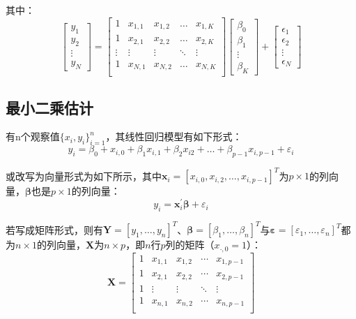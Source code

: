 \documentclass[11pt]{article}
\begin{document}
其中：
\begin{equation*}
    \begin{bmatrix}
        y_1 \\
        y_2 \\
        \vdots \\
        y_N
    \end{bmatrix} =
    \begin{bmatrix}
        1 & x_{1,1} & x_{1,2} & \dots & x_{1,K} \\
        1 & x_{2,1} & x_{2,2} & \dots & x_{2,K} \\
        \vdots & \vdots & \vdots & \ddots & \vdots \\
        1 & x_{N,1} & x_{N,2} & \dots & x_{N,K} \\
    \end{bmatrix}
    \begin{bmatrix}
        \beta_0 \\
        \beta_1 \\
        \vdots \\
        \beta_K
    \end{bmatrix} + 
    \begin{bmatrix}
        \epsilon_1 \\
        \epsilon_2 \\
        \vdots \\
        \epsilon_N
    \end{bmatrix}
\end{equation*}

\subsection{最小二乘估计}

有n个观察值$\{x_i,y_i\}_{i=1}^{n}$，其线性回归模型有如下形式：
\begin{equation*}
    y_i = \beta_0 + x_{i,0} + \beta_1 x_{i,1} + \beta_2 x_{i2} + \dots + \beta_{p-1} x_{i,p-1} + \varepsilon_{i}
\end{equation*}

或改写为向量形式为如下所示，其中$\bm{x}_i = [x_{i,0},x_{i,2},\dots,x_{i,p-1}]^{T}$为$p\times 1$的列向量，$\bm{\beta}$也是$p \times 1$的列向量：
\begin{equation*}
    y_i = \bm{x}_{i}^{'} \bm{\beta} + \varepsilon_i
\end{equation*}

若写成矩阵形式，则有$\bm{Y}=[y_1,\dots,y_n]^{T}$、$\bm{\beta}=[\beta_1,\dots,\beta_n]^{T}$与$\bm{\varepsilon}=[\varepsilon_1,\dots,\varepsilon_n]^{T}$都为$n\times 1$的列向量，$\bm{X}$为$n\times p$，即$n$行$p$列的矩阵（$x_{\cdot,0}=1$）：
\begin{equation*}
    \bm{X} =
    \begin{bmatrix}
        1 & x_{1,1} & x_{1,2} & \cdots & x_{1,p-1} \\
        1 & x_{2,1} & x_{2,2} & \cdots & x_{2,p-1} \\
        1 & \vdots  & \vdots  & \ddots & \vdots    \\
        1 & x_{n,1} & x_{n,2} & \cdots & x_{n,p-1} \\
    \end{bmatrix}
\end{equation*}
\end{document}

